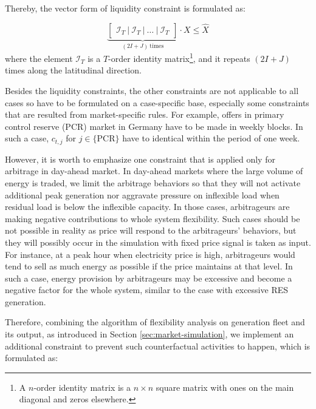 Thereby, the vector form of liquidity constraint is formulated as:
 
\begin{equation}
\label{eq:liquidity}
	\underbrace{\begin{bmatrix}
	\mathcal{I}_T~|~\mathcal{I}_T~|~ \dots~|~\mathcal{I}_T 
	\end{bmatrix}}_{(2I+J)~\text{times}}\cdot X \leq \hat{X}
\end{equation}
where the element $\mathcal{I}_T$ is a $T$-order identity matrix\footnote{A $n$-order identity matrix is a $n \times n$ square matrix with ones on the main diagonal and zeros elsewhere.}, and it repeats $(2I+J)$ times along the latitudinal direction.

Besides the liquidity constraints, the other constraints are not applicable to all cases so have to be formulated on a case-specific base, especially some constraints that are resulted from market-specific rules. For example, offers in primary control reserve (PCR) market in Germany have to be made in weekly blocks. In such a case, $c_{t,j}$ for $j \in \{\text{PCR}\}$ have to identical within the period of one week.

However, it is worth to emphasize one constraint that is applied only for arbitrage in day-ahead market. In day-ahead markets where the large volume of energy is traded, we limit the arbitrage behaviors so that they will not activate additional peak generation nor aggravate pressure on inflexible load when residual load is below the inflexible capacity. In those cases, arbitrageurs are making negative contributions to whole system flexibility. Such cases should be not possible in reality as price will respond to the arbitrageurs' behaviors, but they will possibly occur in the simulation with fixed price signal is taken as input. For instance, at a peak hour when electricity price is high, arbitrageurs would tend to sell as much energy as possible if the price maintains at that level. In such a case, energy provision by arbitrageurs may be excessive and become a negative factor for the whole system, similar to the case with excessive RES generation.

Therefore, combining the algorithm of flexibility analysis on generation fleet and its output, as introduced in Section \ref{sec:market-simulation}, we implement an additional constraint to prevent such counterfactual activities to happen, which is formulated as:

